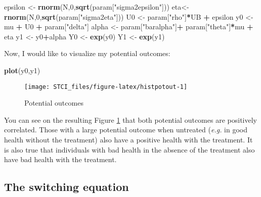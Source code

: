 \documentclass[]{book}
\newenvironment{Shaded}{\begin{snugshade}}{\end{snugshade}}
\newcommand{\KeywordTok}[1]{\textcolor[rgb]{0.13,0.29,0.53}{\textbf{#1}}}
\newcommand{\DecValTok}[1]{\textcolor[rgb]{0.00,0.00,0.81}{#1}}
\newcommand{\StringTok}[1]{\textcolor[rgb]{0.31,0.60,0.02}{#1}}
\newcommand{\OperatorTok}[1]{\textcolor[rgb]{0.81,0.36,0.00}{\textbf{#1}}}
\newcommand{\NormalTok}[1]{#1}
\theoremstyle{definition}
\theoremstyle{definition}
\theoremstyle{definition}
\theoremstyle{remark}
\begin{document}
\begin{Shaded}
\begin{Highlighting}[]
\NormalTok{epsilon <-}\StringTok{ }\KeywordTok{rnorm}\NormalTok{(N,}\DecValTok{0}\NormalTok{,}\KeywordTok{sqrt}\NormalTok{(param[}\StringTok{"sigma2epsilon"}\NormalTok{]))}
\NormalTok{eta<-}\StringTok{ }\KeywordTok{rnorm}\NormalTok{(N,}\DecValTok{0}\NormalTok{,}\KeywordTok{sqrt}\NormalTok{(param[}\StringTok{"sigma2eta"}\NormalTok{]))}
\NormalTok{U0 <-}\StringTok{ }\NormalTok{param[}\StringTok{"rho"}\NormalTok{]}\OperatorTok{*}\NormalTok{UB }\OperatorTok{+}\StringTok{ }\NormalTok{epsilon}
\NormalTok{y0 <-}\StringTok{ }\NormalTok{mu }\OperatorTok{+}\StringTok{  }\NormalTok{U0 }\OperatorTok{+}\StringTok{ }\NormalTok{param[}\StringTok{"delta"}\NormalTok{]}
\NormalTok{alpha <-}\StringTok{ }\NormalTok{param[}\StringTok{"baralpha"}\NormalTok{]}\OperatorTok{+}\StringTok{  }\NormalTok{param[}\StringTok{"theta"}\NormalTok{]}\OperatorTok{*}\NormalTok{mu }\OperatorTok{+}\StringTok{ }\NormalTok{eta}
\NormalTok{y1 <-}\StringTok{ }\NormalTok{y0}\OperatorTok{+}\NormalTok{alpha}
\NormalTok{Y0 <-}\StringTok{ }\KeywordTok{exp}\NormalTok{(y0)}
\NormalTok{Y1 <-}\StringTok{ }\KeywordTok{exp}\NormalTok{(y1)}
\end{Highlighting}
\end{Shaded}

Now, I would like to visualize my potential outcomes:

\begin{Shaded}
\begin{Highlighting}[]
\KeywordTok{plot}\NormalTok{(y0,y1)}
\end{Highlighting}
\end{Shaded}

\begin{figure}

{\centering \texttt{[image: STCI\_files/figure-latex/histpotout-1]} 

}

\caption{Potential outcomes}\label{fig:histpotout}
\end{figure}

You can see on the resulting Figure \ref{fig:histpotout} that both
potential outcomes are positively correlated. Those with a large
potential outcome when untreated (\emph{e.g.} in good health without the
treatment) also have a positive health with the treatment. It is also
true that individuals with bad health in the absence of the treatment
also have bad health with the treatment.

\subsection{The switching equation}\label{the-switching-equation}
\end{document}
